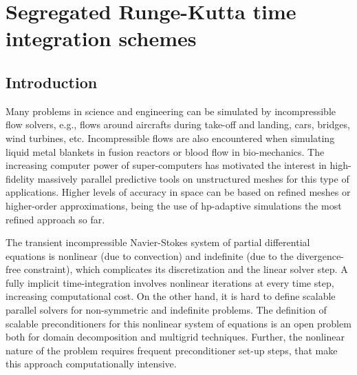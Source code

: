 \chapter{Segregated Runge-Kutta time integration schemes}
\label{chap-SRK}

\section{Introduction}
\label{sec-C6_introduction}

Many problems in science and engineering can be simulated by incompressible flow solvers, e.g., flows around aircrafts during take-off and landing, cars, bridges, wind turbines, etc. Incompressible flows are also encountered when simulating liquid metal blankets in fusion reactors or blood flow in bio-mechanics. The increasing computer power of super-computers has motivated the interest in high-fidelity massively parallel predictive tools on unstructured meshes for this type of applications. Higher levels of accuracy in space can be based on refined meshes or higher-order approximations, being the use of hp-adaptive simulations the most refined approach so far.

The transient incompressible Navier-Stokes system of partial differential equations is nonlinear (due to convection) and indefinite (due to the divergence-free constraint), which complicates its discretization and the linear solver step. A fully implicit time-integration involves nonlinear iterations at every time step, increasing computational cost. On the other hand, it is hard to define scalable parallel solvers for non-symmetric and indefinite problems. The definition of scalable preconditioners for this nonlinear system of equations is an open problem both for domain decomposition and multigrid techniques. 
Further, the nonlinear nature of the problem requires frequent preconditioner set-up steps, that make this approach computationally intensive. 

